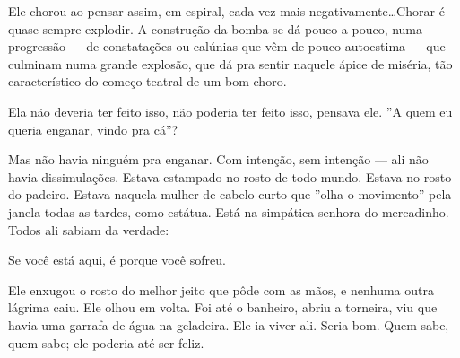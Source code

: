 Ele chorou ao pensar assim, em espiral, cada vez mais negativamente\ldots Chorar é quase sempre explodir. A construção da bomba se dá pouco a pouco, numa progressão --- de constatações ou calúnias que vêm de pouco autoestima --- que culminam numa grande explosão, que dá pra sentir naquele ápice de miséria, tão característico do começo teatral de um bom choro.

Ela não deveria ter feito isso, não poderia ter feito isso, pensava ele. ''A quem eu queria enganar, vindo pra cá''?

Mas não havia ninguém pra enganar. Com intenção, sem intenção --- ali não havia dissimulações. Estava estampado no rosto de todo mundo. Estava no rosto do padeiro. Estava naquela mulher de cabelo curto que ''olha o movimento'' pela janela todas as tardes, como estátua. Está na simpática senhora do mercadinho. Todos ali sabiam da verdade:

Se você está aqui, é porque você sofreu.

Ele enxugou o rosto do melhor jeito que pôde com as mãos, e nenhuma outra lágrima caiu. Ele olhou em volta. Foi até o banheiro, abriu a torneira, viu que havia uma garrafa de água na geladeira. Ele ia viver ali. Seria bom. Quem sabe, quem sabe; ele poderia até ser feliz.
